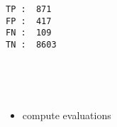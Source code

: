 \documentclass[11pt]{article}
\providecommand{\tightlist}{%
      \setlength{\itemsep}{0pt}\setlength{\parskip}{0pt}}
\begin{document}
    \begin{Verbatim}[commandchars=\\\{\}]
TP :  871
FP :  417
FN :  109
TN :  8603

    \end{Verbatim}

    \begin{center}
    \end{center}
    { \hspace*{\fill} \\}
    
    \begin{center}
    \end{center}
    { \hspace*{\fill} \\}
    
    \begin{itemize}
\tightlist
\item
  compute evaluations
\end{itemize}
\end{document}
